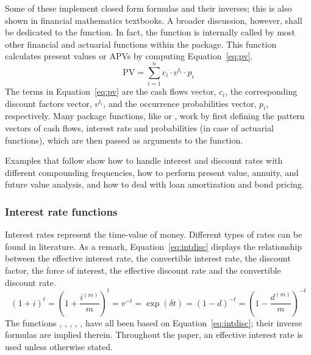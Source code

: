 \documentclass[nojss]{jss}
\begin{document}
Some of these implement closed form formulas and their inverses; this
is also shown in financial mathematics textbooks. A broader
discussion, however, shall be dedicated to the 
function. In fact, the  function is internally
called by most other financial and actuarial functions within the
 package. This function calculates present
values or APVs by computing Equation~\ref{eq:pv}.
%
\begin{equation}
\text{PV}=\sum\limits_{i = 1}^n {c_i\cdot v^{t_i}\cdot p_i} 
\label{eq:pv}
\end{equation}
%
The terms in Equation~\ref{eq:pv} are the cash flows vector, $c_i$,
the corresponding discount factors vector, $v^{t_i}$, and the
occurrence probabilities vector, $p_i$, respectively. Many
 package functions, like  or
, work by first defining the pattern vectors of cash
flows, interest rate and probabilities (in case of actuarial
functions), which are then passed as arguments to the
 function.

Examples that follow show how to handle interest and discount rates
with different compounding frequencies, how to perform present value,
annuity, and future value analysis, and how to deal with loan
amortization and bond pricing.



\subsubsection{Interest rate functions}\label{sss:subsubInterest}
Interest rates represent the time-value of money. Different
types of rates can be found in literature. As a remark,
Equation~\ref{eq:intdisc} displays the relationship between the effective interest
rate, the convertible interest rate, the discount factor, the force of interest, the effective
discount rate and the convertible discount rate.
%
\begin{equation}
\left( 1 + i \right)^t = \left( 1 + \frac{i^{\left( m \right)}}{m} \right)^t = v^{-t} =
\exp \left( \delta t \right) = \left( 1 - d \right)^{ - t} = 
\left( 1 - \frac{d^{\left( m \right)}}{m} \right)^{ - t}
\label{eq:intdisc}
\end{equation}
%
The functions , ,
, \linebreak
{}, ,
 have all been based on
Equation~\ref{eq:intdisc}; their inverse formulas are implied
therein. Throughout the paper, an effective interest rate is used
unless otherwise stated.
\end{document}
